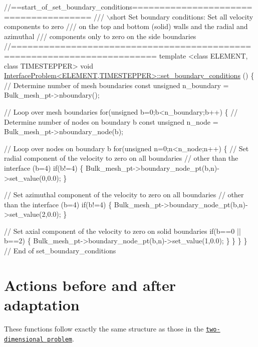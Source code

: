 \begin{DoxyCodeInclude}
\textcolor{comment}{//==start\_of\_set\_boundary\_conditions======================================}
\textcolor{comment}{/// \(\backslash\)short Set boundary conditions: Set all velocity components to zero}
\textcolor{comment}{}\textcolor{comment}{/// on the top and bottom (solid) walls and the radial and azimuthal}
\textcolor{comment}{}\textcolor{comment}{/// components only to zero on the side boundaries}
\textcolor{comment}{}\textcolor{comment}{//========================================================================}
\textcolor{keyword}{template} <\textcolor{keyword}{class} ELEMENT, \textcolor{keyword}{class} TIMESTEPPER>
\textcolor{keywordtype}{void} \hyperlink{classInterfaceProblem_a844445832ad7a32aa9f5d03ffdb40ebb}{InterfaceProblem<ELEMENT,TIMESTEPPER>::set\_boundary\_conditions}
      ()
\{
 \textcolor{comment}{// Determine number of mesh boundaries}
 \textcolor{keyword}{const} \textcolor{keywordtype}{unsigned} n\_boundary = Bulk\_mesh\_pt->nboundary();
 
 \textcolor{comment}{// Loop over mesh boundaries}
 \textcolor{keywordflow}{for}(\textcolor{keywordtype}{unsigned} b=0;b<n\_boundary;b++)
  \{
   \textcolor{comment}{// Determine number of nodes on boundary b}
   \textcolor{keyword}{const} \textcolor{keywordtype}{unsigned} n\_node = Bulk\_mesh\_pt->nboundary\_node(b);
   
   \textcolor{comment}{// Loop over nodes on boundary b}
   \textcolor{keywordflow}{for}(\textcolor{keywordtype}{unsigned} n=0;n<n\_node;n++)
    \{
     \textcolor{comment}{// Set radial component of the velocity to zero on all boundaries}
     \textcolor{comment}{// other than the interface (b=4)}
     \textcolor{keywordflow}{if}(b!=4) \{ Bulk\_mesh\_pt->boundary\_node\_pt(b,n)->set\_value(0,0.0); \}

     \textcolor{comment}{// Set azimuthal component of the velocity to zero on all boundaries}
     \textcolor{comment}{// other than the interface (b=4)}
     \textcolor{keywordflow}{if}(b!=4) \{ Bulk\_mesh\_pt->boundary\_node\_pt(b,n)->set\_value(2,0.0); \}

     \textcolor{comment}{// Set axial component of the velocity to zero on solid boundaries}
     \textcolor{keywordflow}{if}(b==0 || b==2)
      \{
       Bulk\_mesh\_pt->boundary\_node\_pt(b,n)->set\_value(1,0.0);
      \}
    \}
  \}
\} \textcolor{comment}{// End of set\_boundary\_conditions}

\end{DoxyCodeInclude}
\hypertarget{index_before_after_adapt}{}\section{Actions before and after adaptation}\label{index_before_after_adapt}
These functions follow exactly the same structure as those in the \href{../../../navier_stokes/two_layer_interface/html/index.html#before_adapt}{\tt two-\/dimensional problem}.



